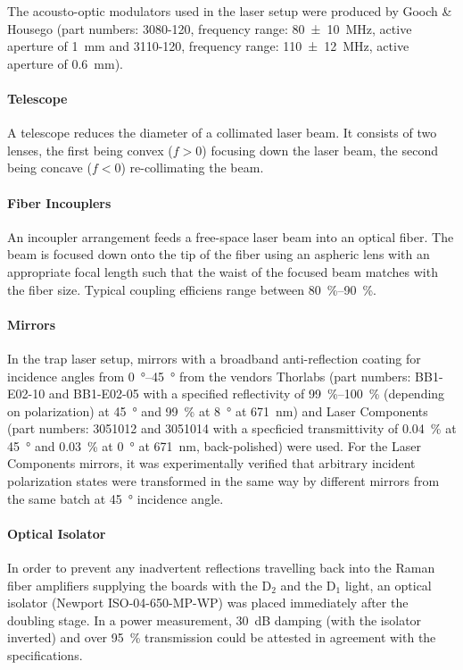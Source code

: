 The acousto-optic modulators used in the laser setup were produced by Gooch \& Housego (part numbers: 3080-120, frequency range: \SI{80(10)}{\mega\hertz}, active aperture of \SI{1}{\milli\meter} and 3110-120, frequency range: \SI{110(12)}{\mega\hertz}, active aperture of \SI{0.6}{\milli\meter}).

\paragraph{Telescope} A telescope reduces the diameter of a collimated laser beam. It consists of two lenses, the first being convex ($f > 0$) focusing down the laser beam, the second being concave ($f < 0$) re-collimating the beam.
    
\paragraph{Fiber Incouplers} An incoupler arrangement feeds a free-space laser beam into an optical fiber. The beam is focused down onto the tip of the fiber using an aspheric lens with an appropriate focal length such that the waist of the focused beam matches with the fiber size. Typical coupling efficiens range between \SIrange[]{80}{90}{\percent}.
    
\paragraph{Mirrors}
In the trap laser setup, mirrors with a broadband anti-reflection coating for incidence angles from \SIrange[]{0}{45}{\degree} from the vendors Thorlabs (part numbers: BB1-E02-10 and BB1-E02-05 with a specified reflectivity of \SIrange[]{99}{100}{\percent} (depending on polarization) at \SI[]{45}{\degree} and \SI[]{99}{\percent} at \SI[]{8}{\degree} at \SI[]{671}{\nano\meter}) and Laser Components (part numbers: 3051012 and 3051014 with a specficied transmittivity of \SI[]{0.04}{\percent} at \SI[]{45}{\degree} and \SI[]{0.03}{\percent} at \SI[]{0}{\degree} at \SI[]{671}{\nano\meter}, back-polished) were used. For the Laser Components mirrors, it was experimentally verified that arbitrary incident polarization states were transformed in the same way by different mirrors from the same batch at \SI[]{45}{\degree} incidence angle.

\paragraph{Optical Isolator}
In order to prevent any inadvertent reflections travelling back into the Raman fiber amplifiers supplying the boards with the D$_2$ and the D$_1$ light, an optical isolator (Newport ISO-04-650-MP-WP) was placed immediately after the doubling stage. In a power measurement, \SI{30}{\deci\bel} damping (with the isolator inverted) and over \SI{95}{\percent} transmission could be attested in agreement with the specifications.

